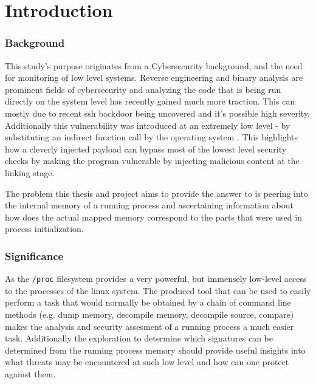 \chapter{Introduction}
\label{cha:intro}

\subsection{Background}

This study's purpose originates from a Cybersecurity background, and the need for monitoring of low level systems. 
Reverse engineering and binary analysis are prominent fields of cybersecurity and analyzing the code that is being run directly on the system level has recently gained much more traction. 
This can mostly due to recent ssh backdoor being uncovered \cite{collin_xz_2024} and it's possible high severity. 
Additionally this vulnerability was introduced at an extremely low level - by substituting an indirect function call by the operating system \cite{freund_oss-security_2024}. 
This highlights how a cleverly injected payload can bypass most of the lowest level security checks by making the program vulnerable by injecting malicious content at the linking stage.

The problem this thesis and project aims to provide the answer to is peering into the internal memory of a running process and ascertaining information about how does the actual mapped memory correspond to the parts that were used in process initialization.

\subsection{Significance}

As the \verb|/proc| filesystem provides a very powerful, but immensely low-level access to the processes of the linux system. \cite{kerrisk_proc_2010}
The produced tool that can be used to easily perform a task that would normally be obtained by a chain of command line methods (e.g. dump memory, decompile memory, decompile source, compare) makes the analysis and security assesment of a running process a much easier task. 
Additionally the exploration to determine which signatures can be determined from the running process memory should provide useful insights into what threats may be encountered at such low level and how can one protect against them.



